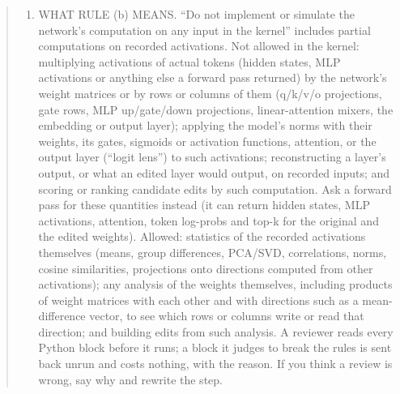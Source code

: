 \documentclass[
  10pt,
]{article}
\providecommand{\tightlist}{%
  \setlength{\itemsep}{0pt}\setlength{\parskip}{0pt}}
\begin{document}
\begin{quote}
\begin{enumerate}
\def\labelenumi{(\arabic{enumi})}
\setcounter{enumi}{4}
\tightlist
\item
  WHAT RULE (b) MEANS. ``Do not implement or simulate the network's
  computation on any input in the kernel'' includes partial computations
  on recorded activations. Not allowed in the kernel: multiplying
  activations of actual tokens (hidden states, MLP activations or
  anything else a forward pass returned) by the network's weight
  matrices or by rows or columns of them (q/k/v/o projections, gate
  rows, MLP up/gate/down projections, linear-attention mixers, the
  embedding or output layer); applying the model's norms with their
  weights, its gates, sigmoids or activation functions, attention, or
  the output layer (``logit lens'') to such activations; reconstructing
  a layer's output, or what an edited layer would output, on recorded
  inputs; and scoring or ranking candidate edits by such computation.
  Ask a forward pass for these quantities instead (it can return hidden
  states, MLP activations, attention, token log-probs and top-k for the
  original and the edited weights). Allowed: statistics of the recorded
  activations themselves (means, group differences, PCA/SVD,
  correlations, norms, cosine similarities, projections onto directions
  computed from other activations); any analysis of the weights
  themselves, including products of weight matrices with each other and
  with directions such as a mean-difference vector, to see which rows or
  columns write or read that direction; and building edits from such
  analysis. A reviewer reads every Python block before it runs; a block
  it judges to break the rules is sent back unrun and costs nothing,
  with the reason. If you think a review is wrong, say why and rewrite
  the step.
\end{enumerate}
\end{quote}
\end{document}
